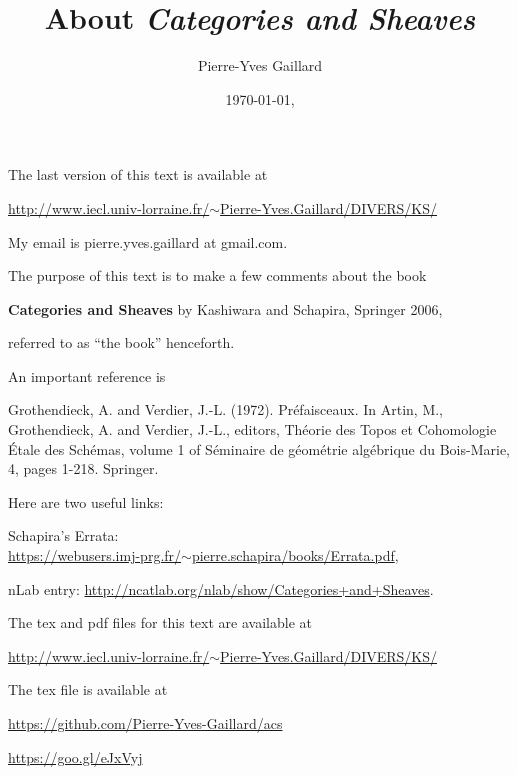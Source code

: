 \documentclass[12pt]{article}
\title{About \em{Categories and Sheaves}}
\author{Pierre-Yves Gaillard}%
\date{\today, \currenttime}
\theoremstyle{remark}
\theoremstyle{definition}
\begin{document}
\maketitle

\nn The last version of this text is available at\medskip

\centerline{\href{http://www.iecl.univ-lorraine.fr/~Pierre-Yves.Gaillard/DIVERS/KS/}{http://www.iecl.univ-lorraine.fr/$\sim$Pierre-Yves.Gaillard/DIVERS/KS/}}

My email is pierre.yves.gaillard at gmail.com.

\tableofcontents\newpage

\nn The purpose of this text is to make a few comments about the book 

\textbf{Categories and Sheaves} by Kashiwara and Schapira, Springer 2006, 

\nn referred to as ``the book'' henceforth. 

An important reference is

\nn[GV] Grothendieck, A. and Verdier, J.-L. (1972). Préfaisceaux. In Artin, M., Grothendieck, A. and Verdier, J.-L., editors, Théorie des Topos et Cohomologie Étale des Schémas, volume 1 of Séminaire de géométrie algébrique du Bois-Marie, 4, pages 1-218. Springer. 


Here are two useful links:

\nn Schapira's Errata:\\ \href{https://webusers.imj-prg.fr/~pierre.schapira/books/Errata.pdf}{https://webusers.imj-prg.fr/$\sim$pierre.schapira/books/Errata.pdf}, 

\nn nLab entry: \href{http://ncatlab.org/nlab/show/Categories+and+Sheaves}{http://ncatlab.org/nlab/show/Categories+and+Sheaves}. 

The tex and pdf files for this text are available at
 
\nn\href{http://www.iecl.univ-lorraine.fr/~Pierre-Yves.Gaillard/DIVERS/KS/}{http://www.iecl.univ-lorraine.fr/$\sim$Pierre-Yves.Gaillard/DIVERS/KS/}

The tex file is available at

\nn\href{https://github.com/Pierre-Yves-Gaillard/acs}{https://github.com/Pierre-Yves-Gaillard/acs}

\nn\href{https://goo.gl/eJxVyj}{https://goo.gl/eJxVyj}
\end{document}
